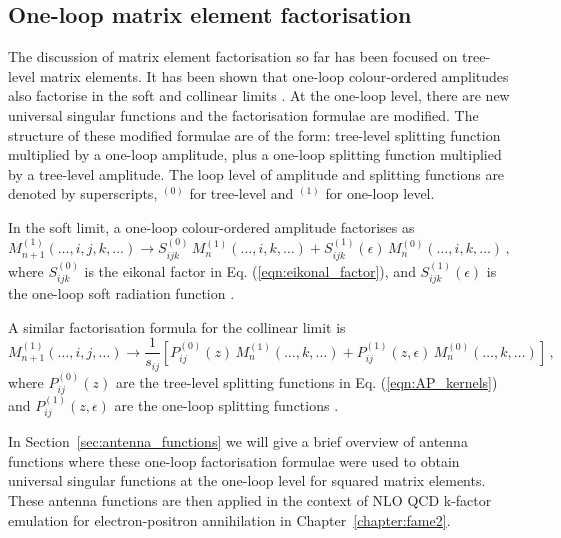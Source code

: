 \documentclass[main.tex]{subfiles}
\begin{document}
\subsection{One-loop matrix element factorisation}\label{sec:OL_factorisation}
    The discussion of matrix element factorisation so
    far has been focused on tree-level matrix elements.
    It has been shown that one-loop colour-ordered amplitudes
    also factorise in the soft and collinear limits \cite{Bern:1994zx,Bern:1995ix,Bern:1998sc,Kosower:1999xi}.
    At the one-loop level, there are new universal singular
    functions and the factorisation formulae are modified.
    The structure of these modified formulae are of the form:
    tree-level splitting function multiplied by a one-loop
    amplitude, plus a one-loop splitting function multiplied
    by a tree-level amplitude. The loop level of
    amplitude and splitting functions are denoted by superscripts,
    $^{(0)}$ for tree-level and $^{(1)}$ for one-loop level.

    In the soft limit, a one-loop colour-ordered amplitude
    factorises as
    \begin{equation}\label{eqn:1L_soft_factorisation}
        M_{n+1}^{(1)}(\ldots, i, j, k, \ldots) \rightarrow S_{ijk}^{(0)} \, M_{n}^{(1)}(\ldots, i, k, \ldots) + S_{ijk}^{(1)}(\epsilon) \, M_{n}^{(0)}(\ldots, i, k, \ldots) \, ,
    \end{equation}
    where $S_{ijk}^{(0)}$ is the eikonal factor in Eq. (\ref{eqn:eikonal_factor}),
    and $S_{ijk}^{(1)}(\epsilon)$ is the one-loop soft radiation function \cite{Bern:1999ry}.

    A similar factorisation formula for the collinear limit is
    \begin{equation}\label{eqn:1L_collinear_factorisation}
        M_{n+1}^{(1)}(\ldots, i, j, \ldots) \rightarrow \dfrac{1}{s_{ij}} \left[ P_{ij}^{(0)}(z) \, M_{n}^{(1)}(\ldots, k, \ldots) + P_{ij}^{(1)}(z, \epsilon) \, M_{n}^{(0)}(\ldots, k, \ldots) \right] \, ,
    \end{equation}
    where $P_{ij}^{(0)}(z)$ are the tree-level splitting functions
    in Eq. (\ref{eqn:AP_kernels}) and $P_{ij}^{(1)}(z, \epsilon)$
    are the one-loop splitting functions \cite{Bern:1999ry}.

    In Section~\ref{sec:antenna_functions} we will give
    a brief overview of antenna functions where these one-loop
    factorisation formulae were used to obtain universal singular functions
    at the one-loop level for squared matrix elements. These
    antenna functions are then applied in the context of NLO QCD
    k-factor emulation for electron-positron annihilation in Chapter~\ref{chapter:fame2}.
\end{document}
